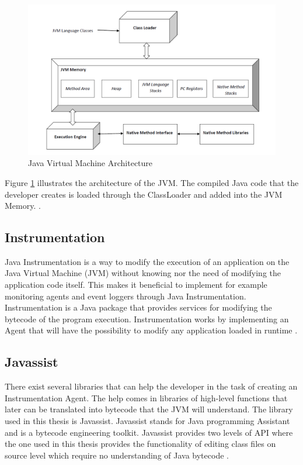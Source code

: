 \begin{figure}
    \centering
    \includegraphics[width=\textwidth]{images/JvmSpec7.png}
    \caption{Java Virtual Machine Architecture}
    \label{fig:JVM}
\end{figure}

Figure \ref{fig:JVM} illustrates the architecture of the JVM. The compiled Java code that the developer creates is loaded through the ClassLoader and added into the JVM Memory. \parencite{venners_1999}.


\subsection{Instrumentation}
Java Instrumentation is a way to modify the execution of an application on the Java Virtual Machine (JVM) without knowing nor the need of modifying the application code itself. This makes it beneficial to implement for example monitoring agents and event loggers through Java Instrumentation. Instrumentation is a Java package that provides services for modifying the bytecode of the program execution. Instrumentation works by implementing an Agent that will have the possibility to modify any application loaded in runtime \parencite{Java_Instrument}.


\subsection{Javassist}
There exist several libraries that can help the developer in the task of creating an Instrumentation Agent. The help comes in libraries of high-level functions that later can be translated into bytecode that the JVM will understand. The library used in this thesis is Javassist. Javassist stands for Java programming Assistant and is a bytecode engineering toolkit. Javassist provides two levels of API where the one used in this thesis provides the functionality of editing class files on source level which require no understanding of Java bytecode \parencite{Javassist}.